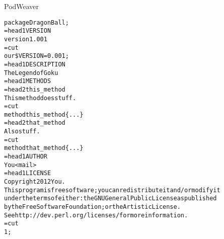 \documentclass[serif,14pt,color=usenames,dvipsnames]{beamer}
\begin{document}
\begin{frame}{PodWeaver}        %
\begin{alltt}
\tiny
package DragonBall;\\
=head1 VERSION\\
version 1.001\\
=cut\\
our \$VERSION = 0.001;\\
=head1 DESCRIPTION\\
The Legend of Goku\\
=head1 METHODS\\
=head2 this\_method\\
This method does stuff.\\
=cut\\
method this\_method \{ ... \}\\
=head2 that\_method\\
Also stuff.\\
=cut\\
method that\_method \{ ... \}\\
=head1 AUTHOR\\
You <mail>\\
=head1 LICENSE\\
Copyright 2012 You.\\
This program is free software; you can redistribute it and/or modify it
under the terms of either: the GNU General Public License as published
by the Free Software Foundation; or the Artistic License.\\
See http://dev.perl.org/licenses/ for more information.\\
=cut\\
1;\\
\end{alltt}
\end{frame}
\end{document}
